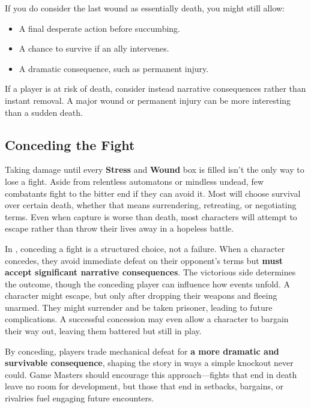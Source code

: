 \begin{multicols}{2}
If you do consider the last wound as essentially death, you might still allow:
\begin{itemize}
    \item A final desperate action before succumbing.
    \item A chance to survive if an ally intervenes.
    \item A dramatic consequence, such as permanent injury.
\end{itemize}

\begin{GmTips}
	If a player is at risk of death, consider instead narrative consequences rather than instant removal. A major wound or permanent injury can be more interesting than a sudden death.
\end{GmTips}


\newcolumn
\subsection{Conceding the Fight}\label{core:conceding}

Taking damage until every \textbf{Stress} and \textbf{Wound} box is filled isn’t the only way to lose a fight. Aside from relentless automatons or mindless undead, few combatants fight to the bitter end if they can avoid it. Most will choose survival over certain death, whether that means surrendering, retreating, or negotiating terms. Even when capture is worse than death, most characters will attempt to escape rather than throw their lives away in a hopeless battle.

In \wyrd, conceding a fight is a structured choice, not a failure. When a character concedes, they avoid immediate defeat on their opponent’s terms but \textbf{must accept significant narrative consequences}. The victorious side determines the outcome, though the conceding player can influence how events unfold. A character might escape, but only after dropping their weapons and fleeing unarmed. They might surrender and be taken prisoner, leading to future complications. A successful concession may even allow a character to bargain their way out, leaving them battered but still in play.

By conceding, players trade mechanical defeat for \textbf{a more dramatic and survivable consequence}, shaping the story in ways a simple knockout never could. Game Masters should encourage this approach—fights that end in death leave no room for development, but those that end in setbacks, bargains, or rivalries fuel engaging future encounters.


\end{multicols}
